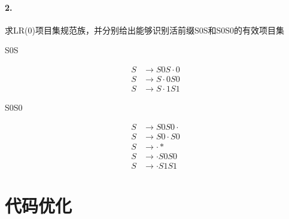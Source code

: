 \documentclass[UTF8]{ctexart} %
\begin{document}
\paragraph{2.} 求LR(0)项目集规范族，并分别给出能够识别活前缀S0S和S0S0的有效项目集

S0S

\begin{equation}
    \begin{aligned}
        S & \rightarrow S0S\cdot0 \\
        S & \rightarrow S\cdot0S0 \\
        S & \rightarrow S\cdot1S1
    \end{aligned}
\end{equation}

S0S0

\begin{equation}
    \begin{aligned}
        S & \rightarrow S0S0\cdot  \\
        S & \rightarrow S0\cdot S0 \\
        S & \rightarrow \cdot *    \\
        S & \rightarrow \cdot S0S0 \\
        S & \rightarrow \cdot S1S1
    \end{aligned}
\end{equation}

\section{代码优化}
\end{document}
